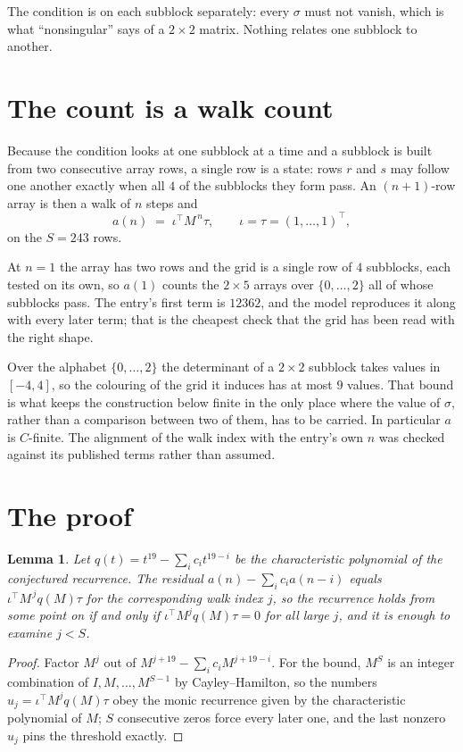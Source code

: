 \documentclass[11pt,a4paper]{article}
\theoremstyle{plain}
\newtheorem{lemma}[theorem]{Lemma}
\theoremstyle{definition}
\begin{document}
The condition is on each subblock separately: every $\sigma$ must not vanish, which is what
``nonsingular'' says of a $2\times2$ matrix. Nothing
relates one subblock to another.

\section{The count is a walk count}

Because the condition looks at one subblock at a time and a subblock is
built from two consecutive array rows, a single row is a state: rows $r$ and $s$ may follow one
another exactly when all $4$ of the subblocks they form pass. An $(n+1)$-row array is then a
walk of $n$ steps and
\[
a(n)\;=\;\iota^{\!\top}M^{\,n}\tau,\qquad\iota=\tau=(1,\dots,1)^{\!\top},
\]
on the $S=243$ rows.

At $n=1$ the array has two rows and the grid is a single row of $4$
subblocks, each tested on its own, so $a(1)$ counts the
$2\times5$ arrays over $\{0,\dots,2\}$ all of whose subblocks pass. The entry's
first term is $12362$, and the model reproduces it along with every later term; that is the
cheapest check that the grid has been read with the right shape.

Over the alphabet $\{0,\dots,2\}$ the determinant of a $2\times2$ subblock takes values in
$[-4,4]$, so the colouring of the grid it induces has at most $9$ values.
That bound is what keeps the construction below finite in the only place where the value of
$\sigma$, rather than a comparison between two of them, has to be carried.
In particular $a$ is $C$-finite. The alignment of the walk index with the entry's own $n$ was
checked against its published terms rather than assumed.

\section{The proof}

\begin{lemma}\label{lem:crit}
Let $q(t)=t^{19}-\sum_i c_it^{19-i}$ be the characteristic polynomial of the
conjectured recurrence. The residual $a(n)-\sum_ic_ia(n-i)$ equals
$\iota^{\!\top}M^{\,j}q(M)\tau$ for the corresponding walk index $j$, so the recurrence
holds from some point on if and only if $\iota^{\!\top}M^{j}q(M)\tau=0$ for all large $j$,
and it is enough to examine $j<S$.
\end{lemma}

\begin{proof}
Factor $M^{j}$ out of $M^{j+19}-\sum_ic_iM^{j+19-i}$. For the bound, $M^{S}$
is an integer combination of $I,M,\dots,M^{S-1}$ by Cayley--Hamilton, so the numbers
$u_j=\iota^{\!\top}M^{j}q(M)\tau$ obey the monic recurrence given by the characteristic
polynomial of $M$; $S$ consecutive zeros force every later one, and the last nonzero $u_j$
pins the threshold exactly.
\end{proof}
\end{document}
